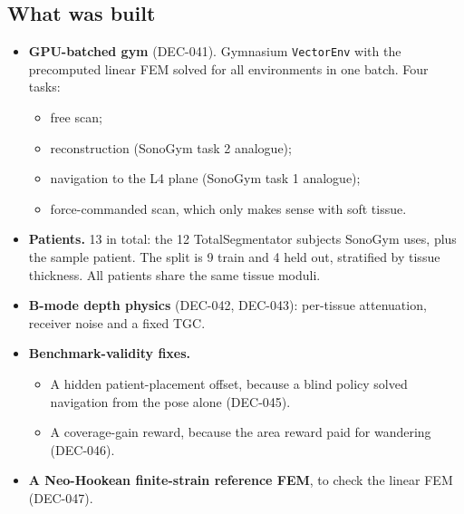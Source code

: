 \documentclass[11pt,a4paper]{article}
\newcommand{\dec}[1]{\textsf{#1}}
\begin{document}
\subsection{What was built}
\begin{itemize}
  \item \textbf{GPU-batched gym} (\dec{DEC-041}). Gymnasium \texttt{VectorEnv} with the precomputed linear FEM solved
    for all environments in one batch. Four tasks:
    \begin{itemize}
      \item free scan;
      \item reconstruction (SonoGym task 2 analogue);
      \item navigation to the L4 plane (SonoGym task 1 analogue);
      \item force-commanded scan, which only makes sense with soft tissue.
    \end{itemize}
  \item \textbf{Patients.} 13 in total: the 12 TotalSegmentator subjects SonoGym uses, plus the sample patient. The
    split is 9 train and 4 held out, stratified by tissue thickness. All patients share the same tissue moduli.
  \item \textbf{B-mode depth physics} (\dec{DEC-042}, \dec{DEC-043}): per-tissue attenuation, receiver noise and a
    fixed TGC.
  \item \textbf{Benchmark-validity fixes.}
    \begin{itemize}
      \item A hidden patient-placement offset, because a blind policy solved navigation from the pose alone
        (\dec{DEC-045}).
      \item A coverage-gain reward, because the area reward paid for wandering (\dec{DEC-046}).
    \end{itemize}
  \item \textbf{A Neo-Hookean finite-strain reference FEM}, to check the linear FEM (\dec{DEC-047}).
\end{itemize}
\end{document}
